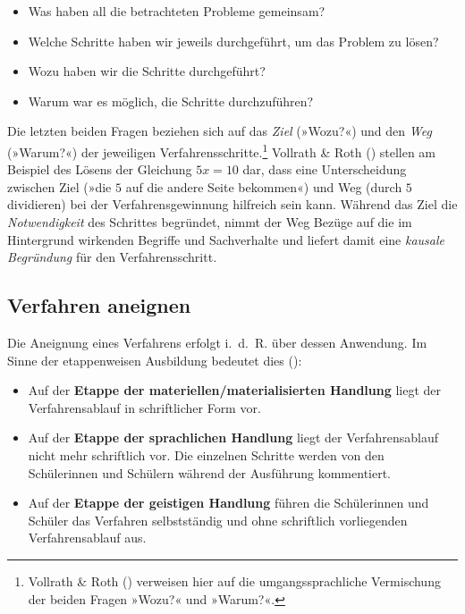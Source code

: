 \documentclass[
]{scrbook}
\providecommand{\tightlist}{%
  \setlength{\itemsep}{0pt}\setlength{\parskip}{0pt}}
\theoremstyle{definition}
\theoremstyle{definition}
\theoremstyle{definition}
\theoremstyle{definition}
\theoremstyle{remark}
\begin{document}
\begin{itemize}
\tightlist
\item
  Was haben all die betrachteten Probleme gemeinsam?
\item
  Welche Schritte haben wir jeweils durchgeführt, um das Problem zu lösen?
\item
  Wozu haben wir die Schritte durchgeführt?
\item
  Warum war es möglich, die Schritte durchzuführen?
\end{itemize}

Die letzten beiden Fragen beziehen sich auf das \emph{Ziel} (»Wozu?«) und den \emph{Weg} (»Warum?«) der jeweiligen Verfahrensschritte.\footnote{Vollrath \& Roth () verweisen hier auf die umgangssprachliche Vermischung der beiden Fragen »Wozu?« und »Warum?«.} Vollrath \& Roth () stellen am Beispiel des Lösens der Gleichung \(5x = 10\) dar, dass eine Unterscheidung zwischen Ziel (»die \(5\) auf die andere Seite bekommen«) und Weg (durch \(5\) dividieren) bei der Verfahrensgewinnung hilfreich sein kann. Während das Ziel die \emph{Notwendigkeit} des Schrittes begründet, nimmt der Weg Bezüge auf die im Hintergrund wirkenden Begriffe und Sachverhalte und liefert damit eine \emph{kausale Begründung} für den Verfahrensschritt.

\subsection{Verfahren aneignen}\label{verfahren-aneignen}

Die Aneignung eines Verfahrens erfolgt i.~d.~R. über dessen Anwendung. Im Sinne der etappenweisen Ausbildung bedeutet dies ():

\begin{itemize}
\tightlist
\item
  Auf der \textbf{Etappe der materiellen/materialisierten Handlung} liegt der Verfahrensablauf in schriftlicher Form vor.
\item
  Auf der \textbf{Etappe der sprachlichen Handlung} liegt der Verfahrensablauf nicht mehr schriftlich vor. Die einzelnen Schritte werden von den Schülerinnen und Schülern während der Ausführung kommentiert.
\item
  Auf der \textbf{Etappe der geistigen Handlung} führen die Schülerinnen und Schüler das Verfahren selbstständig und ohne schriftlich vorliegenden Verfahrensablauf aus.
\end{itemize}
\end{document}
